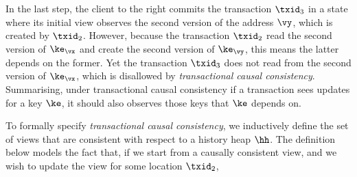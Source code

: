 
In the last step, the client to the right commits the transaction $\txid_3$ in a state where its initial view observes the second version of the address $\vy$, which is created by \( \txid_{2} \).
However, because the transaction \( \txid_{2} \) read the second version of \( \ke_\vx \) and create the second version of \( \ke_\vy \), this means the latter depends on the former.
Yet the transaction \( \txid_{3} \) does not read from the second version of \( \ke_\vx \), which is disallowed by \emph{transactional causal consistency}.
Summarising, under transactional causal consistency if a transaction sees updates for a key \( \ke \), it should also observes those keys that \( \ke \) depends on.


To formally specify \emph{transactional causal consistency}, we inductively define the set of views that are consistent with respect to a history heap $\hh$. 
The definition below models the fact that, if we start from a causally consistent view, and we wish to update the view for some location $\txid_2$, 


